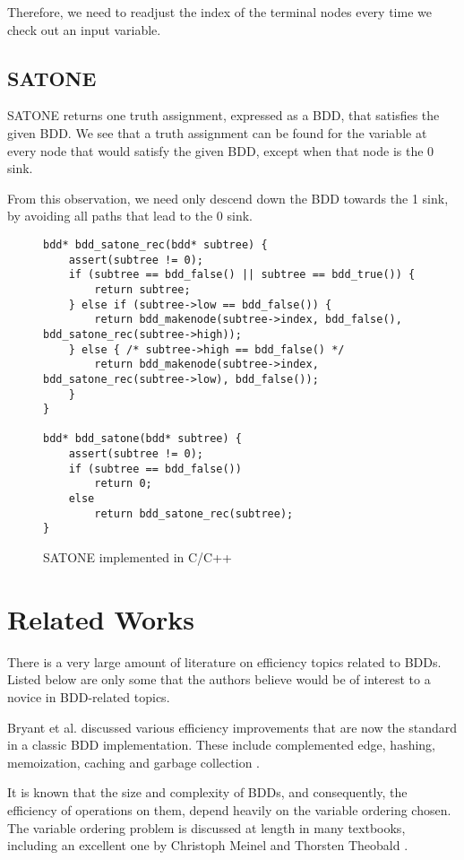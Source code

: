 \documentclass[12pt]{article}
\begin{document}
Therefore, we need to readjust the index of the terminal nodes every time we check out an input variable.

\subsection{SATONE}
SATONE returns one truth assignment, expressed as a BDD, that satisfies the given BDD. We see that a truth assignment can be found for the variable at every node that would satisfy the given BDD, except when that node is the 0 sink. 

From this observation, we need only descend down the BDD towards the 1 sink, by avoiding all paths that lead to the 0 sink.

\begin{figure}[h!]
\begin{lstlisting}
bdd* bdd_satone_rec(bdd* subtree) {
    assert(subtree != 0);
    if (subtree == bdd_false() || subtree == bdd_true()) {
        return subtree;
    } else if (subtree->low == bdd_false()) {
        return bdd_makenode(subtree->index, bdd_false(), bdd_satone_rec(subtree->high));
    } else { /* subtree->high == bdd_false() */
        return bdd_makenode(subtree->index, bdd_satone_rec(subtree->low), bdd_false());
    }
}

bdd* bdd_satone(bdd* subtree) {
    assert(subtree != 0);
    if (subtree == bdd_false())
        return 0;
    else
        return bdd_satone_rec(subtree);
}
\end{lstlisting}
\caption{SATONE implemented in C/C++}
\end{figure}

\section*{Related Works}
There is a very large amount of literature on efficiency topics related to BDDs. Listed below are only some that the authors believe would be of interest to a novice in BDD-related topics. 

Bryant et al. discussed various efficiency improvements that are now the standard in a classic BDD implementation. These include complemented edge, hashing, memoization, caching and garbage collection \cite{brb90}.

It is known that the size and complexity of BDDs, and consequently, the efficiency of operations on them, depend heavily on the variable ordering chosen. The variable ordering problem is discussed at length in many textbooks, including an excellent one by Christoph Meinel and Thorsten Theobald \cite{vlsi}.
\end{document}
